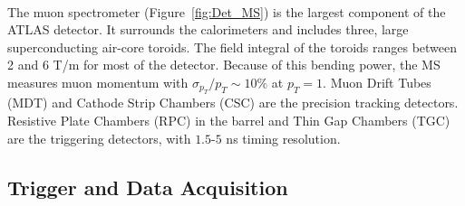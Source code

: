 \paragraph{}
The muon spectrometer (Figure~\ref{fig:Det_MS}) is the largest component of the ATLAS detector.
It surrounds the calorimeters and includes three, large superconducting air-core toroids. 
The field integral of the toroids ranges between 2 and 6 T/m for most of the detector. Because of this bending power, the MS measures muon momentum with $\sigma_{p_{T}}/p_{T} \sim 10\%$ at $p_{T} = 1$\TeV. 
Muon Drift Tubes (MDT) and Cathode Strip Chambers (CSC) are the precision tracking detectors. 
Resistive Plate Chambers (RPC) in the barrel and Thin Gap Chambers (TGC) are the triggering detectors, with $1.5$-$5$ ns timing resolution. 

\subsection{Trigger and Data Acquisition}

